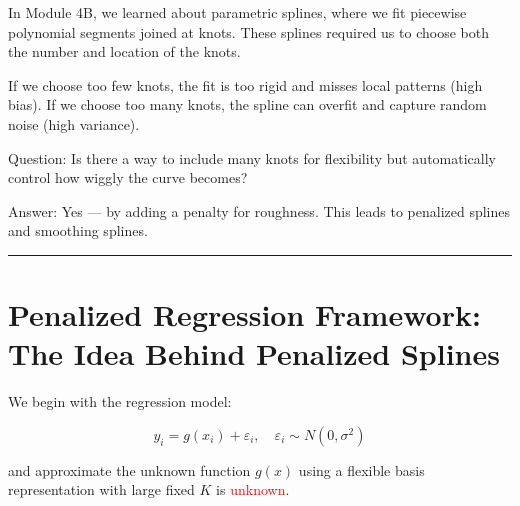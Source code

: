 \documentclass[
  letterpaper,
  DIV=11,
  numbers=noendperiod]{scrreprt}
\begin{document}
\begin{tcolorbox}[enhanced jigsaw, breakable, colbacktitle=quarto-callout-important-color!10!white, left=2mm, colframe=quarto-callout-important-color-frame, opacityback=0, coltitle=black, colback=white, rightrule=.15mm, title=\textcolor{quarto-callout-important-color}{\faExclamation}\hspace{0.5em}{Motivation}, titlerule=0mm, opacitybacktitle=0.6, leftrule=.75mm, toprule=.15mm, arc=.35mm, bottomtitle=1mm, toptitle=1mm, bottomrule=.15mm]

In Module 4B, we learned about parametric splines, where we fit
piecewise polynomial segments joined at knots. These splines required us
to choose both the number and location of the knots.

If we choose too few knots, the fit is too rigid and misses local
patterns (high bias). If we choose too many knots, the spline can
overfit and capture random noise (high variance).

Question: Is there a way to include many knots for flexibility but
automatically control how wiggly the curve becomes?

Answer: Yes --- by adding a penalty for roughness. This leads to
penalized splines and smoothing splines.

\end{tcolorbox}

\begin{center}\rule{0.5\linewidth}{0.5pt}\end{center}

\hypertarget{penalized-regression-framework-the-idea-behind-penalized-splines}{%
\section*{Penalized Regression Framework: The Idea Behind Penalized
Splines}\label{penalized-regression-framework-the-idea-behind-penalized-splines}}


We begin with the regression model:

\[
y_i = g(x_i) + \varepsilon_i, \quad \varepsilon_i \sim N(0,\sigma^2)
\]

and approximate the unknown function \(g(x)\) using a flexible basis
representation with large fixed \(K\) is \textcolor{red}{unknown}.
\end{document}
